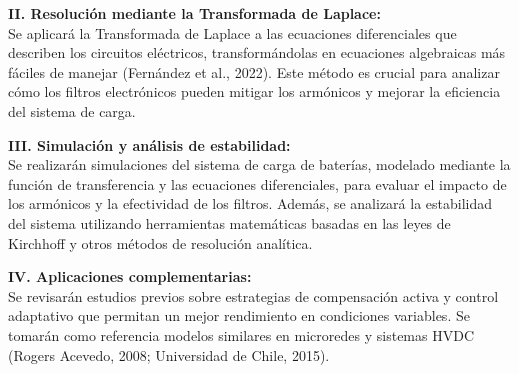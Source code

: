 \textbf{II. Resoluci\'on mediante la Transformada de Laplace:}\\
Se aplicar\'a la Transformada de Laplace a las ecuaciones diferenciales que describen los circuitos el\'ectricos, transform\'andolas en ecuaciones algebraicas m\'as f\'aciles de manejar (Fern\'andez et al., 2022). Este m\'etodo es crucial para analizar c\'omo los filtros electr\'onicos pueden mitigar los arm\'onicos y mejorar la eficiencia del sistema de carga.
\vspace{1em}

\textbf{III. Simulaci\'on y an\'alisis de estabilidad:}\\
Se realizar\'an simulaciones del sistema de carga de bater\'ias, modelado mediante la funci\'on de transferencia y las ecuaciones diferenciales, para evaluar el impacto de los arm\'onicos y la efectividad de los filtros. Adem\'as, se analizar\'a la estabilidad del sistema utilizando herramientas matem\'aticas basadas en las leyes de Kirchhoff y otros m\'etodos de resoluci\'on anal\'itica.
\vspace{1em}

\textbf{IV. Aplicaciones complementarias:}\\
Se revisar\'an estudios previos sobre estrategias de compensaci\'on activa y control adaptativo que permitan un mejor rendimiento en condiciones variables. Se tomar\'an como referencia modelos similares en microredes y sistemas HVDC (Rogers Acevedo, 2008; Universidad de Chile, 2015).

\newpage
